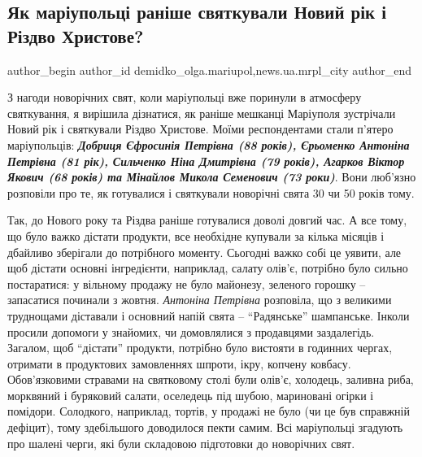  
 
 
 
 
 
\subsection{Як маріупольці раніше святкували Новий рік і Різдво Христове?}
\label{sec:06_01_2019.stz.news.ua.mrpl_city.1.jak_mrplcy_svjatkyvaly_nv_rik_rizdvo}
 
\ifcmt
 author_begin
   author_id demidko_olga.mariupol,news.ua.mrpl_city
 author_end
\fi

З нагоди новорічних свят, коли маріупольці вже поринули в атмосферу
святкування, я вирішила дізнатися, як раніше мешканці Маріуполя зустрічали
Новий рік і святкували Різдво Христове. Моїми респондентами стали п'ятеро
маріупольців: \textbf{\em Добриця Єфросинія Петрівна (88 років), Єрьоменко Антоніна
Петрівна (81 рік), Сильченко Ніна Дмитрівна (79 років), Агарков Віктор Якович
(68 років) та Мінайлов Микола Семенович (73 роки)}. Вони люб'язно розповіли про
те, як готувалися і святкували новорічні свята 30 чи 50 років тому.


Так, до Нового року та Різдва раніше готувалися доволі довгий час. А все тому,
що було важко дістати продукти, все необхідне купували за кілька місяців і
дбайливо зберігали до потрібного моменту. Сьогодні важко собі це уявити, але
щоб дістати основні інгредієнти, наприклад, салату олів'є, потрібно було сильно
постаратися: у вільному продажу не було майонезу, зеленого горошку – запасатися
починали з жовтня. \emph{Антоніна Петрівна} розповіла, що з великими труднощами
діставали і основний напій свята – \enquote{Радянське} шампанське. Інколи просили
допомоги у знайомих, чи домовлялися з продавцями заздалегідь. Загалом, щоб
\enquote{дістати} продукти, потрібно було вистояти в годинних чергах, отримати в
продуктових замовленнях шпроти, ікру, копчену ковбасу. Обов'язковими стравами
на святковому столі були олів'є, холодець, заливна риба, морквяний і буряковий
салати, оселедець під шубою, мариновані огірки і помідори. Солодкого,
наприклад, тортів, у продажі не було (чи це був справжній дефіцит), тому
здебільшого доводилося пекти самим. Всі маріупольці згадують про шалені черги,
які були складовою підготовки до новорічних свят.

